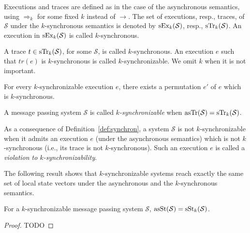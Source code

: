 Executions and traces are defined as in the case of the asynchronous semantics, using $\Rightarrow_k$ for some fixed $k$ instead of $\rightarrow$. The set of executions, resp., traces, of $\mathcal{S}$ under the $k$-synchronous semantics is denoted by $\synchExec{\mathcal{S}}{k}$, resp., $\synchTr{\mathcal{S}}{k}$. An execution in $\synchExec{\mathcal{S}}{k}$ is called $k$-synchronous. 

A trace $t\in \synchTr{\mathcal{S}}{k}$, for some $\mathcal{S}$, is called $k$-synchronous. An execution $e$ such that $tr(e)$ is $k$-synchronous is called $k$-synchronizable. We omit $k$ when it is not important.

\begin{lemma}\label{lem:zable_nous}
For every $k$-synchronizable execution $e$, there exists a permutation $e'$ of $e$ which is $k$-synchronous.
\end{lemma}


\begin{definition}\label{def:synchron}
A message passing system $\mathcal{S}$ is called \emph{$k$-synchronizable} when $\asynchTr{\mathcal{S}}=\synchTr{\mathcal{S}}{k}$.
\end{definition}

As a consequence of Definition~\ref{def:synchron}, a system $\mathcal{S}$ is not $k$-synchronizable when it admits an execution $e$ (under the asynchronous semantics) which is not $k$-synchronous (i.e., its trace is not $k$-synchronous). Such an execution $e$ is called a \emph{violation to $k$-synchronizability}.

The following result shows that $k$-synchronizable systems reach exactly the same set of local state vectors under the asynchronous and the $k$-synchronous semantics. 

\begin{theorem}
For a $k$-synchronizable message passing system $\mathcal{S}$, $\asynchSt{\mathcal{S}}=\synchSt{\mathcal{S}}{k}$.
\end{theorem}
\begin{proof}
TODO 
\end{proof}

